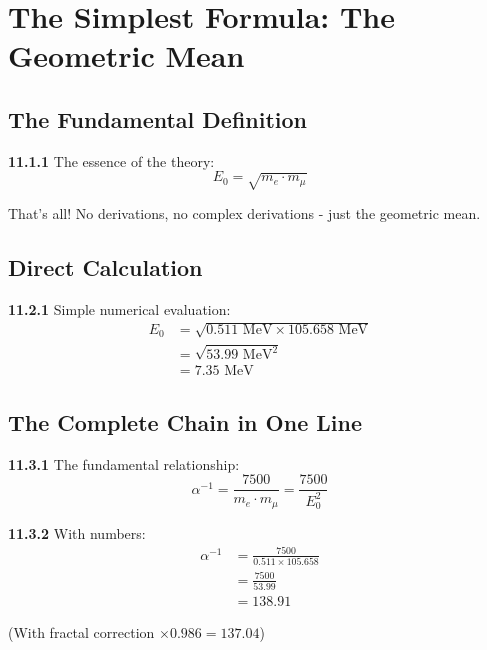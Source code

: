 \documentclass[12pt,a4paper]{article}
\begin{document}
\section{The Simplest Formula: The Geometric Mean}

\subsection{The Fundamental Definition}

\begin{tcolorbox}[colback=yellow!10!white,colframe=red!75!black,title=\textbf{THE SIMPLEST FORMULA}]
	\noindent \textbf{11.1.1} The essence of the theory:
	\begin{equation}
		\boxed{E_0 = \sqrt{m_e \cdot m_\mu}}
	\end{equation}
	
	That's all! No derivations, no complex derivations - just the geometric mean.
\end{tcolorbox}

\subsection{Direct Calculation}

\noindent \textbf{11.2.1} Simple numerical evaluation:
\begin{align}
	E_0 &= \sqrt{0.511 \text{ MeV} \times 105.658 \text{ MeV}} \\
	&= \sqrt{53.99 \text{ MeV}^2} \\
	&= 7.35 \text{ MeV}
\end{align}

\subsection{The Complete Chain in One Line}

\noindent \textbf{11.3.1} The fundamental relationship:
\begin{equation}
	\boxed{\alpha^{-1} = \frac{7500}{m_e \cdot m_\mu} = \frac{7500}{E_0^2}}
\end{equation}

\noindent \textbf{11.3.2} With numbers:
\begin{align}
	\alpha^{-1} &= \frac{7500}{0.511 \times 105.658} \\
	&= \frac{7500}{53.99} \\
	&= 138.91
\end{align}

(With fractal correction $\times 0.986 = 137.04$)
\end{document}
